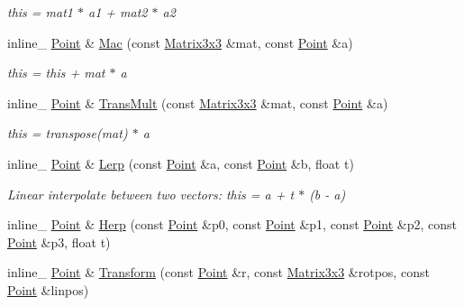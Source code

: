 \begin{DoxyCompactItemize}
\begin{DoxyCompactList}\small\item\em this = mat1 $\ast$ a1 + mat2 $\ast$ a2 \end{DoxyCompactList}\item 
inline\+\_\+ \hyperlink{classPoint}{Point} \& \hyperlink{classPoint_a621e57596702cc399125b53fbaf37b45}{Mac} (const \hyperlink{classMatrix3x3}{Matrix3x3} \&mat, const \hyperlink{classPoint}{Point} \&a)\hypertarget{classPoint_a621e57596702cc399125b53fbaf37b45}{}\label{classPoint_a621e57596702cc399125b53fbaf37b45}

\begin{DoxyCompactList}\small\item\em this = this + mat $\ast$ a \end{DoxyCompactList}\item 
inline\+\_\+ \hyperlink{classPoint}{Point} \& \hyperlink{classPoint_aa3393cd24151ef293d63269dbdac3f21}{Trans\+Mult} (const \hyperlink{classMatrix3x3}{Matrix3x3} \&mat, const \hyperlink{classPoint}{Point} \&a)\hypertarget{classPoint_aa3393cd24151ef293d63269dbdac3f21}{}\label{classPoint_aa3393cd24151ef293d63269dbdac3f21}

\begin{DoxyCompactList}\small\item\em this = transpose(mat) $\ast$ a \end{DoxyCompactList}\item 
inline\+\_\+ \hyperlink{classPoint}{Point} \& \hyperlink{classPoint_a933799ae1f2b356eab7ef4165bedf150}{Lerp} (const \hyperlink{classPoint}{Point} \&a, const \hyperlink{classPoint}{Point} \&b, float t)\hypertarget{classPoint_a933799ae1f2b356eab7ef4165bedf150}{}\label{classPoint_a933799ae1f2b356eab7ef4165bedf150}

\begin{DoxyCompactList}\small\item\em Linear interpolate between two vectors\+: this = a + t $\ast$ (b -\/ a) \end{DoxyCompactList}\item 
inline\+\_\+ \hyperlink{classPoint}{Point} \& \hyperlink{classPoint_aa9c7c852cd5bdf1e31ea744b5acf5e87}{Herp} (const \hyperlink{classPoint}{Point} \&p0, const \hyperlink{classPoint}{Point} \&p1, const \hyperlink{classPoint}{Point} \&p2, const \hyperlink{classPoint}{Point} \&p3, float t)
\item 
inline\+\_\+ \hyperlink{classPoint}{Point} \& \hyperlink{classPoint_ab92e35a48545e6e781ccbcc524a54194}{Transform} (const \hyperlink{classPoint}{Point} \&r, const \hyperlink{classMatrix3x3}{Matrix3x3} \&rotpos, const \hyperlink{classPoint}{Point} \&linpos)\hypertarget{classPoint_ab92e35a48545e6e781ccbcc524a54194}{}\label{classPoint_ab92e35a48545e6e781ccbcc524a54194}


\end{DoxyCompactItemize}
